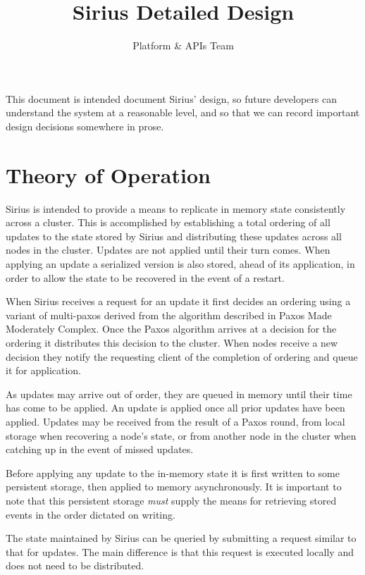 \documentclass[11pt]{article}
\begin{document}
\title{Sirius Detailed Design}
\author{Platform \& APIs Team}
\maketitle

This document is intended document Sirius’ design, so future developers can understand the system at a reasonable level, and so that we can record important design decisions somewhere in prose.  

\section{Theory of Operation}
Sirius is intended to provide a means to replicate in memory state consistently
across a cluster. This is accomplished by establishing a total ordering of all
updates to the state stored by Sirius and distributing these updates across all
nodes in the cluster. Updates are not applied until their turn comes. When
applying an update a serialized version is also stored, ahead of its
application, in order to allow the state to be recovered in the event of a
restart.

When Sirius receives a request for an update it first decides an ordering using
a variant of multi-paxos derived from the algorithm described in Paxos Made     %
Moderately Complex. Once the Paxos algorithm arrives at a decision for the
ordering it distributes this decision to the cluster.  When nodes receive a new
decision they notify the requesting client of the completion of ordering and
queue it for application.

As updates may arrive out of order, they are queued in memory until their time
has come to be applied.  An update is applied once all prior updates have been applied.
Updates may be received from the result of a Paxos round, from local storage
when recovering a node's state, or from another node in the cluster when
catching up in the event of missed updates.

Before applying any update to the in-memory state it is first written to some
persistent storage, then applied to memory asynchronously. It is important to
note that this persistent storage {\em must} supply the means for retrieving
stored events in the order dictated on writing.

The state maintained by Sirius can be queried by submitting a request similar
to that for updates.  The main difference is that this request is executed
locally and does not need to be distributed.
\end{document}
